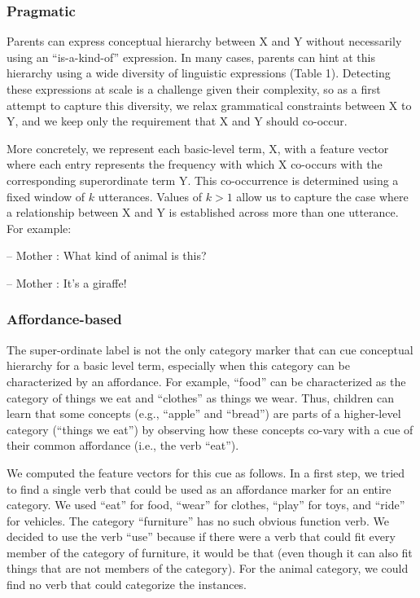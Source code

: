\documentclass[english,,man,floatsintext]{apa6}
\begin{document}
\hypertarget{pragmatic}{%
\subsubsection{Pragmatic}\label{pragmatic}}

Parents can express conceptual hierarchy between X and Y without
necessarily using an \enquote{is-a-kind-of} expression. In many cases, parents
can hint at this hierarchy using a wide diversity of
linguistic expressions (Table 1). Detecting these expressions at scale is a challenge given their complexity, so as a first attempt to capture this diversity, we relax
grammatical constraints between X to Y, and we keep only the requirement
that X and Y should co-occur.

More concretely, we represent each basic-level term, X, with a feature
vector where each entry represents the frequency with which X co-occurs
with the corresponding superordinate term Y. This co-occurrence is
determined using a fixed window of \(k\) utterances. Values of \(k > 1\)
allow us to capture the case where a relationship between X and Y is
established across more than one utterance. For example:

-- Mother : What kind of animal is this?

-- Mother : It's a giraffe!

\hypertarget{affordance-based}{%
\subsubsection{Affordance-based}\label{affordance-based}}

The super-ordinate label is not the only category marker that can cue conceptual hierarchy for a basic level term, especially when this category can be characterized by an affordance. For example, \enquote{food} can be characterized as the category of things we eat and \enquote{clothes} as things we wear. Thus, children can learn that some concepts (e.g., \enquote{apple} and \enquote{bread}) are parts of a higher-level category (\enquote{things we eat}) by observing how these concepts co-vary with a cue of their common affordance (i.e., the verb \enquote{eat}).

We computed the feature vectors for this cue as follows. In a first step, we tried to find a single verb that could be used as an affordance marker for an entire category. We used \enquote{eat} for food, \enquote{wear} for clothes, \enquote{play} for toys, and \enquote{ride} for vehicles. The category \enquote{furniture} has no such obvious function verb. We decided to use the verb \enquote{use} because if there were a verb that could fit every member of the category of furniture, it would be that (even though it can also fit things that are not members of the category). For the animal category, we could find no verb that could categorize the instances.
\end{document}
